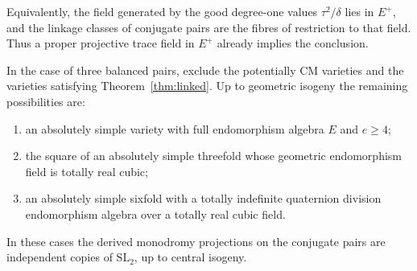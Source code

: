 Equivalently, the field generated by the good degree-one values
\(\tau^2/\delta\) lies in \(E^+\), and the linkage classes of
conjugate pairs are the fibres of restriction to that field.
Thus a proper projective trace field in \(E^+\) already
implies the conclusion.

\begin{proposition}\label{prop:end-frontier}
In the case of three balanced pairs, exclude the potentially CM
varieties and the varieties satisfying Theorem~\ref{thm:linked}.
Up to geometric isogeny the remaining possibilities are:
\begin{enumerate}
\item an absolutely simple variety with full endomorphism algebra
      \(E\) and \(e\ge4\);
\item the square of an absolutely simple threefold whose geometric
      endomorphism field is totally real cubic;
\item an absolutely simple sixfold with a totally indefinite
      quaternion division endomorphism algebra over a totally
      real cubic field.
\end{enumerate}
In these cases the derived monodromy projections on the conjugate
pairs are independent copies of \(\mathrm{SL}_2\), up to central
isogeny.
\end{proposition}

